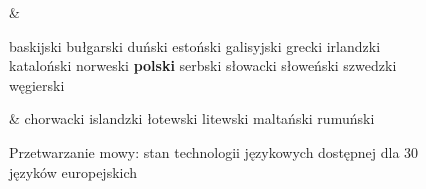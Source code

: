 \begin{figure}[t]
\begin{tabular}
& \vspace*{0.5mm}


baskijski\newline
bułgarski\newline
duński\newline
estoński\newline
galisyjski\newline
grecki\newline
irlandzki\newline
kataloński\newline
norweski\newline
\textbf{polski}\newline
serbski\newline
słowacki\newline
słoweński\newline
szwedzki\newline
węgierski\newline


& \vspace*{0.5mm}
chorwacki \newline 
islandzki \newline  
łotewski \newline 
litewski \newline 
maltański \newline 
rumuński\\
\end{tabular}
\caption{Przetwarzanie mowy: stan technologii językowych dostępnej dla 30 języków europejskich}
\label{fig:speech_cluster_pl}
\end{figure}


